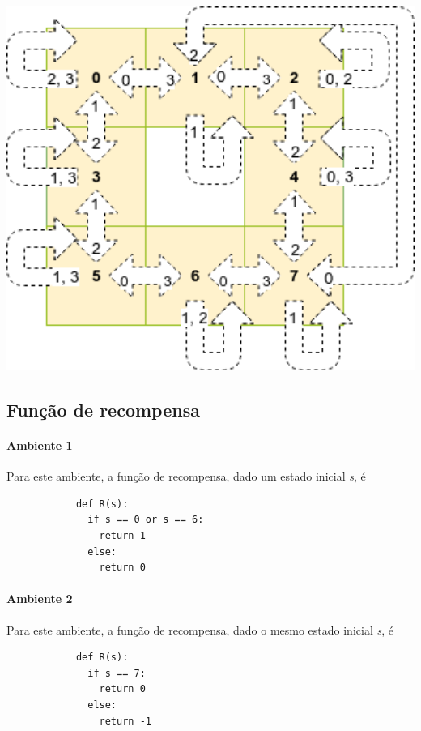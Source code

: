 \documentclass[12pt,a4paper]{article}
\newenvironment{Figure}
  {\par\medskip\noindent\minipage{\linewidth}}
  {\endminipage\par\medskip}
\begin{document}
\begin{multicols}{2}
	\begin{Figure}
		\centering
		\includegraphics[width=1\textwidth]{ambiente2}
		\label{amb2}
	\end{Figure}
	
	\subsection{Função de recompensa}
	\paragraph{Ambiente 1}
	Para este ambiente, a função de recompensa, dado um estado inicial \textit{s}, é
	\begin{verbatim}
			def R(s):
			  if s == 0 or s == 6:
			    return 1
			  else:
			    return 0
	\end{verbatim}

	\paragraph{Ambiente 2}
	Para este ambiente, a função de recompensa, dado o mesmo estado inicial
	\textit{s}, é
	\begin{verbatim}
			def R(s):
			  if s == 7:
			    return 0
			  else:
			    return -1
	\end{verbatim}


\end{multicols}
\end{document}
